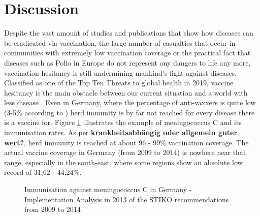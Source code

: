 \documentclass[12pt,a4paper,twoside]{article}
\begin{document}
\section{Discussion}

Despite the vast amount of studies and publications that show how diseases can be eradicated via vaccination, the large number of casualties that occur in communities with extremely low vaccination coverage or the practical fact that diseases such as Polio in Europe do not represent any dangers to life any more, vaccination hesitancy is still undermining mankind's fight against diseases. Classified as one of the Top Ten Threats to global health in 2019, vaccine hesitancy is the main obstacle between our current situation and a world with less disease \cite{WHOAkbar2019}. Even in Germany, where the percentage of anti-vaxxers is quite low (3-5\% according to \cite{Meyer2004}) herd immunity is by far not reached for every disease there is a vaccine for. Figure \ref{fig:impfkarte_meningokokken} illustrates the example of meningococcus C and its immunisation rates. As per \textbf{krankheitsabhängig oder allgemein guter wert?}, herd immunity is reached at about 96 - 99\% vaccination coverage. The actual vaccine coverage in Germany (from 2009 to 2014) is nowhere near that range, especially in the south-east, where some regions show an absolute low record of 31,62 - 44,24\%.

\begin{figure}[h!]
	\centering
	\caption{Immunisation against meningococcus C in Germany - Implementation Analysis in 2013 of the \ac{STIKO} recommendations from 2009 to 2014 \cite{LamegoGreinerMGoffrierB2016}}
	\label{fig:impfkarte_meningokokken}
	\def\svgwidth{350pt}
	
\end{figure}
\end{document}
